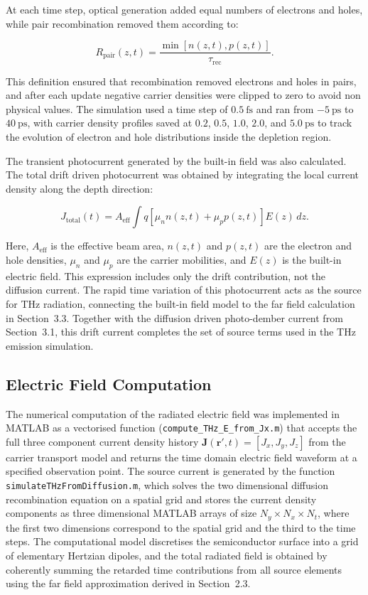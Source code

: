 \documentclass[12pt]{final_project_report}
\begin{document}
At each time step, optical generation added equal numbers of electrons and holes, while pair recombination removed them according to:

\begin{equation}
R_{\mathrm{pair}}(z,t) =
\frac{\min\left[n(z,t),p(z,t)\right]}{\tau_{\mathrm{rec}}}.
\label{eq:pair_recombination}
\end{equation}

This definition ensured that recombination removed electrons and holes in pairs, and after each update negative carrier densities were clipped to zero to avoid non physical values. The simulation used a time step of $0.5~\mathrm{fs}$ and ran from $-5~\mathrm{ps}$ to $40~\mathrm{ps}$, with carrier density profiles saved at $0.2$, $0.5$, $1.0$, $2.0$, and $5.0~\mathrm{ps}$ to track the evolution of electron and hole distributions inside the depletion region.

The transient photocurrent generated by the built-in field was also calculated. The total drift driven photocurrent was obtained by integrating the local current density along the depth direction:

\begin{equation}
J_{\mathrm{total}}(t)
=
A_{\mathrm{eff}}
\int q\left[\mu_n n(z,t)+\mu_p p(z,t)\right]E(z)\,dz .
\label{eq:built_in_total_current}
\end{equation}

Here, $A_{\mathrm{eff}}$ is the effective beam area, $n(z,t)$ and $p(z,t)$ are the electron and hole densities, $\mu_n$ and $\mu_p$ are the carrier mobilities, and $E(z)$ is the built-in electric field. This expression includes only the drift contribution, not the diffusion current. The rapid time variation of this photocurrent acts as the source for THz radiation, connecting the built-in field model to the far field calculation in Section~3.3. Together with the diffusion driven photo-dember current from Section~3.1, this drift current completes the set of source terms used in the THz emission simulation.

\subsection{Electric Field Computation}
The numerical computation of the radiated electric field was implemented in MATLAB as a vectorised function (\texttt{compute\_THz\_E\_from\_Jx.m}) that accepts the full three component current density history $\mathbf{J}(\mathbf{r}', t) = [J_x, J_y, J_z]$ from the carrier transport model and returns the time domain electric field waveform at a specified observation point. The source current is generated by the function \texttt{simulateTHzFromDiffusion.m}, which solves the two dimensional diffusion recombination equation on a spatial grid and stores the current density components as three dimensional MATLAB arrays of size $N_y \times N_x \times N_t$, where the first two dimensions correspond to the spatial grid and the third to the time steps. The computational model discretises the semiconductor surface into a grid of elementary Hertzian dipoles, and the total radiated field is obtained by coherently summing the retarded time contributions from all source elements using the far field approximation derived in Section~2.3.
\end{document}
